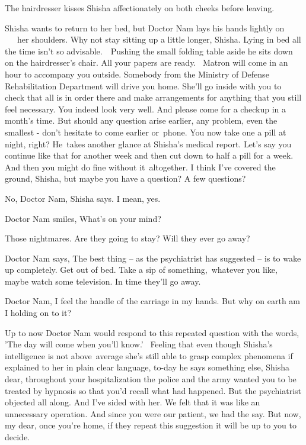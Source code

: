 \documentclass[twoside,11pt]{book}
\begin{document}
The hairdresser kisses Shisha affectionately on both cheeks before leaving.

Shisha wants to return to her bed, but Doctor Nam lays his hands lightly on \ \ \ her shoulders. {\textquotedbl}Why not
stay sitting up a little longer, Shisha. Lying in bed all the time isn't so advisable.{\textquotedbl}\ \ Pushing the
small folding table aside he sits down on the hairdresser's chair. {\textquotedbl}All your papers are
ready.{~} Matron will come in an hour to accompany you outside. Somebody from the Ministry of Defense
Rehabilitation Department will drive you home. She'll go inside with you to check that all is in order there and make
arrangements for anything that you still feel necessary. You indeed look very well. And please come for a checkup in a
month's time.  But should any question arise earlier, any problem, even the smallest - don't hesitate to come earlier
or~phone. You now take one a pill at night, right?{\textquotedbl} He~takes another glance at Shisha's medical report.
{\textquotedbl}Let's say you continue like that for another week and then cut down to half a pill for a week. And then
you might do fine without it\ altogether. I think I've covered the ground, Shisha, but maybe you have a question? A few
questions?{\textquotedbl} 

{\textquotedbl}No, Doctor Nam,{\textquotedbl} Shisha says. {\textquotedbl}I mean, yes.{\textquotedbl} 

Doctor Nam smiles, {\textquotedbl}What's on your mind?{\textquotedbl} 

{\textquotedbl}Those nightmares. Are they going to stay? Will they ever go away?{\textquotedbl} 

Doctor Nam says, {\textquotedbl}The best thing -- as the psychiatrist has suggested -- is to wake up completely. Get out
of bed. Take a sip of something,{\ }whatever you like, maybe watch some
television. In time they{}'ll go away.{\textquotedbl}

{\textquotedbl}Doctor Nam, I feel the handle of the carriage in my hands. But why on earth am I holding on to
it?{\textquotedbl} 

Up to now Doctor Nam would respond to this repeated question with the words, 'The day will come when you'll know.'
~Feeling that even though Shisha{}'s intelligence is not above\ average she's still able to grasp complex phenomena if
explained to her in plain clear language, to-day he says something else, {\textquotedbl}Shisha dear, throughout your
hospitalization the police and the army wanted you to be treated by hypnosis so that you'd recall what had happened.
But the psychiatrist objected all along. And I've sided with her. We felt that it was like an unnecessary operation.
And since you were our patient, we had the say. But now, my dear, once you're home, if they repeat this suggestion it
will be up to you to decide.{\textquotedbl} 
\end{document}
